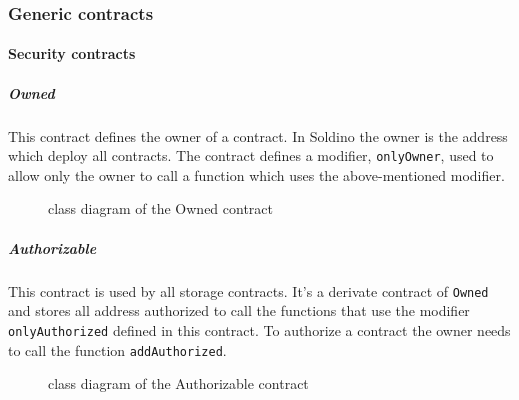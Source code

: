 \subsubsection{Generic contracts}
\paragraph{Security contracts}
\subparagraph{Owned}
This contract defines the owner of a contract. In Soldino the owner is the address which deploy all contracts. The contract defines a modifier, \texttt{onlyOwner}, used to allow only the owner to call a function which uses 
the above-mentioned modifier.
\begin{figure}[H]
	\centering
	\caption{class diagram of the Owned contract}
\end{figure}

\subparagraph{Authorizable}
This contract is used by all storage contracts. It's a derivate contract of \texttt{Owned} and stores 
all address authorized to call the functions that use the modifier \texttt{onlyAuthorized} defined in this contract.
To authorize a contract the owner needs to call the function \texttt{addAuthorized}.
\begin{figure}[H]
	\centering
	\caption{class diagram of the Authorizable contract}
\end{figure}
\pagebreak
